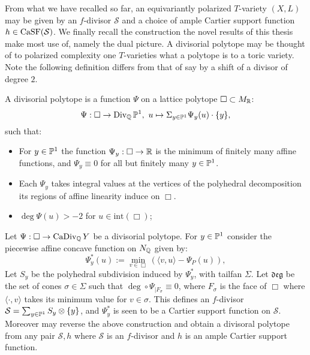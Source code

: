 From what we have recalled so far, an equivariantly polarized \(T\)-variety \((X,L)\) may be given by an \(f\)-divisor \(\mathcal{S}\) and a choice of ample Cartier support function \(h \in \operatorname{CaSF}(\mathcal{S})\). We finally recall the construction the novel results of this thesis make most use of, namely the dual picture. A divisorial polytope may be thought of to polarized complexity one \(T\)-varieties what a polytope is to a toric variety. Note the following definition differs from that of say \cite{suss2013fano} by a shift of a divisor of degree \(2\).
\begin{definition} \label{def:divpol}
A divisorial polytope is a function \(\Psi\) on a lattice polytope \(\Box \subset M_{\mathbb{R}}\):
\[
\Psi: \Box \to \operatorname{Div}_{\mathbb{Q}} \mathbb{P}^1, \ u \mapsto \Sigma_{y \in \mathbb{P}^1} \Psi_y(u) \cdot \{y\},
\]
such that:
\begin{itemize}
\item For \(y \in \mathbb{P}^1\) the function \(\Psi_y: \Box \to \mathbb{R}\) is the minimum of finitely many  affine functions, and \(\Psi_y \equiv 0\) for all but finitely many \(y \in \mathbb{P}^1\).
\item Each \(\Psi_y\) takes integral values at the vertices of the polyhedral decomposition its regions of affine linearity induce on \(\Box\).
\item \(\deg \Psi(u) > -2\) for \(u \in \text{int} (\Box)\);
\end{itemize}
\end{definition}

Let \(\Psi: \Box \to \operatorname{CaDiv}_{\mathbb{Q}} Y\) be a divisorial polytope. For \(y \in \mathbb{P}^1\) consider the piecewise affine concave function on \(N_{\mathbb{Q}}\) given by:
\[
\Psi^*_y(u) := \min_{v \in \Box}( \langle v,u\rangle - \Psi_P(u) ),
\]
Let \(S_y \) be the polyhedral subdivision induced by \(\Psi_y^*\), with tailfan \(\Sigma\). Let \(\mathfrak{deg}\) be the set of cones \(\sigma \in \Sigma\) such that \(\deg \circ \Psi _{|F_\sigma}  \equiv 0\), where \(F_\sigma\) is the face of \(\Box\) where \(\langle \cdot, v \rangle\) takes its minimum value for \(v \in \sigma\). This defines an \(f\)-divisor \(\mathcal{S} = \sum_{y \in \mathbb{P}^1} S_y \otimes \{y\}\), and \(\Psi_y^*\) is seen to be a Cartier support function on \(\mathcal{S}\). Moreover may reverse the above construction and obtain a divisoral polytope from any pair \(\mathcal{S},h\) where \(\mathcal{S}\) is an \(f\)-divisor and \(h\) is an ample Cartier support function.

